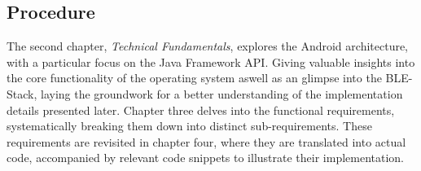 \subsection{Procedure}
{\large
	The second chapter, \textit{Technical Fundamentals}, explores the Android architecture, with a particular focus on the Java Framework API. 
	Giving valuable insights into the core functionality of the operating system aswell as an glimpse into the BLE-Stack, laying the groundwork for a better understanding of the implementation details presented later.  
	Chapter three delves into the functional requirements, systematically breaking them down into distinct sub-requirements. These requirements are revisited in chapter four, where they are translated into actual code, accompanied by relevant code snippets to illustrate their implementation.
}
